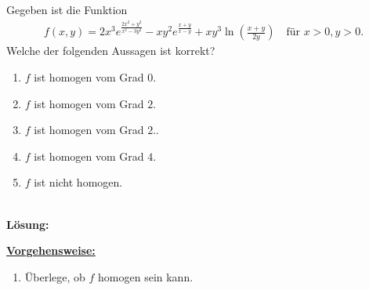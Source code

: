\subsection*{}
Gegeben ist die Funktion
\begin{align*}
	f(x,y) 
	=
	2 x^3 e^{\frac{ 2x^2+y^2}{x^2 - 3y^2 }}
	-
	xy^2 e^{\frac{x+y}{x-y}}
	+
	x y^3 \ln \left( \frac{x+y }{2y} \right)
	\quad \textrm{für } x>0,y>0.
\end{align*}
Welche der folgenden Aussagen ist korrekt?
\renewcommand{\labelenumi}{(\alph{enumi})}
\begin{enumerate}
	\item
	$ f  $ ist homogen vom Grad $ 0 $.
	\item
	$ f  $ ist homogen vom Grad $ 2 $.
	\item
	$ f  $ ist homogen vom Grad $ 2 $..	
	\item 
	$ f  $ ist homogen vom Grad $ 4 $.
	\item
	$ f $ ist nicht homogen.
\end{enumerate}
\ \\
\textbf{Lösung:}
\begin{mdframed}
\underline{\textbf{Vorgehensweise:}}
\renewcommand{\labelenumi}{\theenumi.}
\begin{enumerate}
\item Überlege, ob $ f $ homogen sein kann.
\end{enumerate}
\end{mdframed}

